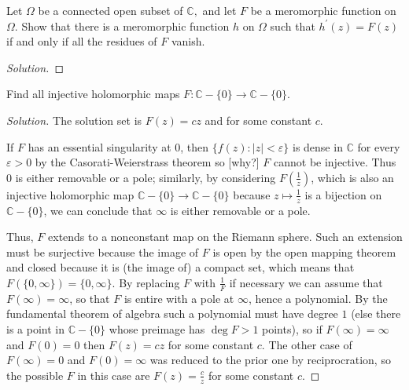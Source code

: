 \documentclass[10pt]{article}
\providecommand{\eps}{\varepsilon}
\providecommand{\CC}{\mathbb C}
\newenvironment{soln}{\begin{proof}[Solution]}{\end{proof}}
\providecommand{\abs}[1]{\left\lvert #1\right\rvert}
\begin{document}
\begin{problem}
[2016 A-I-6]
Let $\Omega$ be a connected open subset of $\mathbb{C},$ and let $F$ be a meromorphic function on $\Omega.$ Show that there is a meromorphic function $h$ on $\Omega$ such that $h^{\prime}(z)=F(z)$ if and only if all the residues of $F$ vanish.
\end{problem}

\begin{soln}

\end{soln}



\begin{problem}
[2016 A-II-5]
Find all injective holomorphic maps $F: \mathbb{C}-\{0\} \longrightarrow \mathbb{C}-\{0\}.$
\end{problem}

\begin{soln}
    The solution set is
    $\boxed{F(z) = cz}$ and 
    for some constant $c$.

    If $F$ has an essential singularity at $0$,
    then $\{f(z) : \abs z < \eps\}$ is dense in $\CC$
    for every $\eps > 0$ by the Casorati-Weierstrass theorem
    so [why?] $F$ cannot be injective.
    Thus $0$ is either removable or a pole;
    similarly, by considering $F(\frac 1z)$,
    which is also an injective holomorphic map
    $\CC - \{0\}\to\CC-\{0\}$ because $z\mapsto\frac 1z$
    is a bijection on $\CC - \{0\}$,
    we can conclude that $\infty$ is either removable or a pole.

    Thus, $F$ extends to a nonconstant map on the Riemann sphere.
    Such an extension must be surjective
    because the image of $F$ is open by the open mapping theorem
    and closed because it is (the image of) a compact set,
    which means that $F(\{0,\infty\}) = \{0,\infty\}$.
    By replacing $F$ with $\frac 1F$ if necessary
    we can assume that $F(\infty) = \infty$,
    so that $F$ is entire with a pole at $\infty$,
    hence a polynomial. By the fundamental theorem of algebra
    such a polynomial must have degree $1$
    (else there is a point in $\CC - \{0\}$
    whose preimage has $\deg F > 1$ points),
    so if $F(\infty) = \infty$ and $F(0) = 0$ then $F(z) = cz$
    for some constant $c$.
    The other case of $F(\infty) = 0$ and $F(0) = \infty$
    was reduced to the prior one by reciprocration,
    so the possible $F$ in this case are $F(z) = \frac cz$
    for some constant $c$.
\end{soln}
\end{document}
